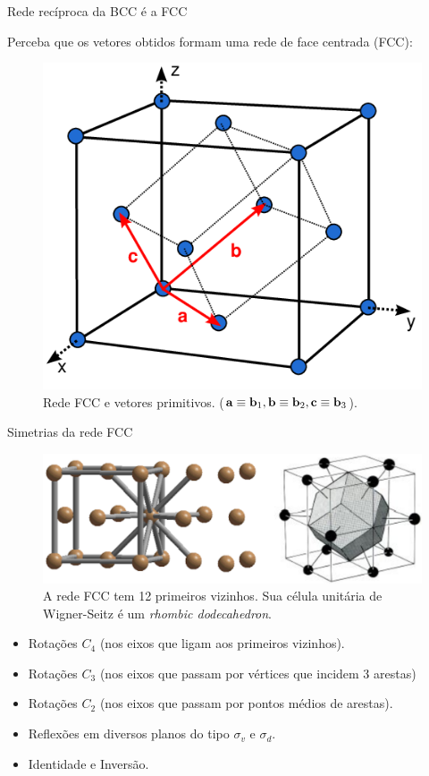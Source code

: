 \documentclass[aspectratio=169]{beamer}
\begin{document}


\begin{frame}{Rede recíproca da BCC é a FCC}

Perceba que os vetores obtidos formam uma rede de face centrada (FCC):
\begin{figure}[H]
\centering
\includegraphics[width=0.4\linewidth]{fig/fcc.png}
\caption{Rede FCC e vetores primitivos. ($\vb{a} \equiv \vb{b}_1, \vb{b} \equiv \vb{b}_2, \vb{c} \equiv \vb{b}_3$).}
\label{fig:fcc}
\end{figure}

\end{frame}




\begin{frame}{Simetrias da rede FCC}

\begin{figure}[H]
\centering
\includegraphics[width=0.7\linewidth]{fig/fcc_wignerseitz.png}
\caption{A rede FCC tem 12 primeiros vizinhos. Sua célula unitária de Wigner-Seitz é um \textit{rhombic dodecahedron}.}
\label{fig:fcc_wignerseitz}
\end{figure}

\begin{itemize}
\item Rotações $C_4$ (nos eixos que ligam aos primeiros vizinhos).
\item Rotações $C_3$ (nos eixos que passam por vértices que incidem 3 arestas)
\item Rotações $C_2$ (nos eixos que passam por pontos médios de arestas).
\item Reflexões em diversos planos do tipo $\sigma_v$ e $\sigma_d$.
\item Identidade e Inversão.
\end{itemize}

\end{frame}
\end{document}
